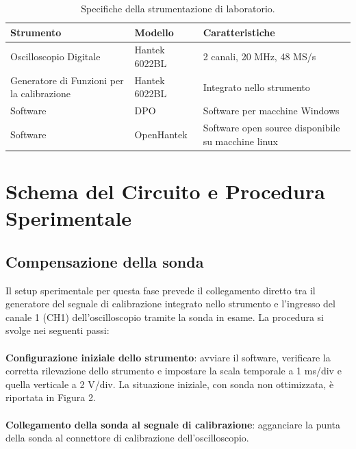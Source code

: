 \documentclass{article}
\begin{document}
    \begin{table}[H]
        \centering
        
        \begin{tabularx}{\textwidth}{|X|X|X|}
            \hline
            \textbf{Strumento} & \textbf{Modello} & \textbf{Caratteristiche} \\ \hline
            Oscilloscopio Digitale & Hantek 6022BL & 2 canali, 20 MHz, 48 MS/s \\ \hline
            Generatore di Funzioni per la calibrazione & Hantek 6022BL & Integrato nello strumento \\ \hline
            Software & DPO & Software per macchine Windows \\ \hline
            Software & OpenHantek & Software open source disponibile su macchine linux \\ \hline
        \end{tabularx}
    \caption{Specifiche della strumentazione di laboratorio.}
    \end{table}

\section{Schema del Circuito e Procedura Sperimentale}

\subsection{Compensazione della sonda}

    Il setup sperimentale per questa fase prevede il collegamento diretto tra il generatore
    del segnale di calibrazione integrato nello strumento e l'ingresso del canale 1 (CH1)
    dell'oscilloscopio tramite la sonda in esame. La procedura si svolge nei seguenti passi: \\ \\

    \noindent \textbf{Configurazione iniziale dello strumento}: avviare il software, verificare la corretta rilevazione
    dello strumento e impostare la scala temporale a 1 ms/div e quella verticale a 2 V/div. La situazione iniziale,
    con sonda non ottimizzata, è riportata in Figura 2. \\ \\ 
    
    \noindent \textbf{Collegamento della sonda al segnale di calibrazione}: agganciare la punta della sonda al connettore di
    calibrazione dell'oscilloscopio. \\ \\
\end{document}
